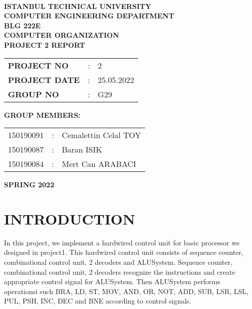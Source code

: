 \documentclass[pdftex,12pt,a4paper]{article}
\begin{document}
\begin{titlepage}
\begin{center}
\textbf{}\\
\textbf{\Large{ISTANBUL TECHNICAL UNIVERSITY}}\\
\vspace{0.5cm}
\textbf{\Large{COMPUTER ENGINEERING DEPARTMENT}}\\
\vspace{2cm}
\textbf{\Large{BLG 222E\\ COMPUTER ORGANIZATION\\ PROJECT 2 REPORT}}\\
\vspace{2.8cm}
\begin{table}[ht]
\centering
\Large{
\begin{tabular}{lcl}
\textbf{PROJECT NO}  & : & 2 \\
\textbf{PROJECT DATE}  & : & 25.05.2022 \\
\textbf{GROUP NO}  & : & G29 \\
\end{tabular}}
\end{table}
\vspace{1cm}
\textbf{\Large{GROUP MEMBERS:}}\\
\begin{table}[ht]
\centering
\Large{
\begin{tabular}{rcl}
150190091  & : & Cemalettin Celal TOY\\
150190087  & : & Baran ISIK\\
150190084  & : & Mert Can ARABACI \\
\end{tabular}}
\end{table}
\vspace{2.8cm}
\textbf{\Large{SPRING 2022}}

\end{center}

\end{titlepage}

\thispagestyle{empty}
\setcounter{tocdepth}{4}
\tableofcontents
\clearpage

\setcounter{page}{1}

\section{INTRODUCTION }
In this project, we implement a hardwired control unit for basic processor we designed in project1. This hardwired control unit consists of sequence counter, combinational control unit, 2 decoders and ALUSystem. Sequence counter, combinational control unit, 2 decoders recognize the instructions and create appropriate control signal for ALUSystem. Then ALUSystem performs operationsi such BRA, LD, ST, MOV, AND, OR, NOT, ADD, SUB, LSR, LSL, PUL, PSH, INC, DEC and BNE according to control signals.
\end{document}
